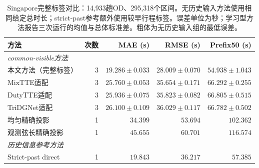 \begin{table}[t]
\centering\footnotesize\setlength{\tabcolsep}{6pt}
\caption{Singapore完整标签对比：14,933趟OD、295,318个区间。无历史输入方法使用相同给定总时长；strict-past参考额外使用较早行程标签。误差单位为秒；学习型方法报告三次运行的均值与总体标准差。粗体为无历史输入组的最低误差。}
\label{tab:singapore-common-visible}
\begin{tabular}{lrrrr}
\toprule
方法 & 次数 & MAE (s) & RMSE (s) & Prefix50 (s)\\
\midrule
\multicolumn{5}{l}{\textit{common-visible方法}}\\
本文方法（完整标签） & 3 & $\mathbf{19.286\pm0.033}$ & $\mathbf{28.009\pm0.070}$ & $\mathbf{54.938\pm1.043}$\\
MixTTE适配 & 3 & $25.760\pm0.053$ & $35.654\pm0.171$ & $66.292\pm0.255$\\
DutyTTE适配 & 3 & $25.936\pm0.075$ & $35.823\pm0.082$ & $66.805\pm0.515$\\
TriDGNet适配 & 3 & $26.100\pm0.109$ & $36.029\pm0.117$ & $66.782\pm0.502$\\
均匀精确投影 & 1 & $34.399$ & $53.694$ & $102.362$\\
观测弦长精确投影 & 1 & $45.655$ & $60.701$ & $116.574$\\
\midrule
\multicolumn{5}{l}{\textit{历史信息参考方法}}\\
Strict-past direct & 1 & $19.843$ & $36.217$ & $57.385$\\
\bottomrule
\end{tabular}
\end{table}
